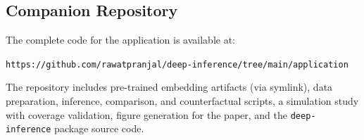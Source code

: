 \subsection{Companion Repository}

The complete code for the application is available at:

\begin{center}
    \texttt{https://github.com/rawatpranjal/deep-inference/tree/main/application}
\end{center}

\noindent The repository includes pre-trained embedding artifacts (via symlink), data preparation, inference, comparison, and counterfactual scripts, a simulation study with coverage validation, figure generation for the paper, and the \texttt{deep-inference} package source code.
